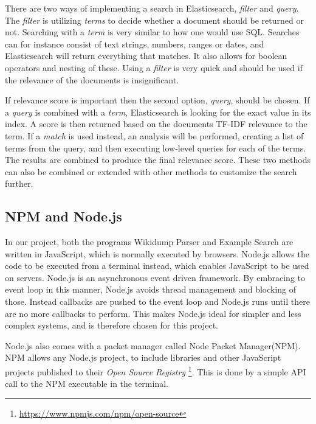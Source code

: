 There are two ways of implementing a search in Elasticsearch, \textit{filter} and \textit{query}. The \textit{filter} is utilizing \textit{terms} to decide whether a document should be returned or not. Searching with a \textit{term} is very similar to how one would use SQL. 
Searches can for instance consist of text strings, numbers, ranges or dates, and Elasticsearch will return everything that matches. It also allows for boolean operators and nesting of these. Using a \textit{filter} is very quick and should be used if the relevance of the documents is insignificant.

If relevance score is important then the second option, \textit{query}, should be chosen. If a \textit{query} is combined with a \textit{term}, Elasticsearch is looking for the exact value in its index. A score is then returned based on the documents TF-IDF relevance to the term. If a \textit{match} is used instead, an analysis will be performed, creating a list of terms from the query, and then executing low-level queries for each of the terms. The results are combined to produce the final relevance score. These two methods can also be combined or extended with other methods to customize the search further.


\subsection{NPM and Node.js}
In our project, both the programs Wikidump Parser and Example Search are written in JavaScript, which is normally executed by browsers. Node.js\cite{node} allows the code to be executed from a terminal instead, which enables JavaScript to be used on servers.  Node.js is an asynchronous event driven framework. By embracing to event loop in this manner, Node.js avoids thread management and blocking of those. Instead callbacks are pushed to the event loop and Node.js runs until there are no more callbacks to perform. This makes Node.js ideal for simpler and less complex systems, and is therefore chosen for this project.

Node.js also comes with a packet manager called Node Packet Manager(NPM). NPM allows any Node.js project, to include libraries and other JavaScript projects published to their \textit{Open Source Registry} \footnote{\url{https://www.npmjs.com/npm/open-source}}. This is done by a simple API call to the NPM executable in the terminal.

